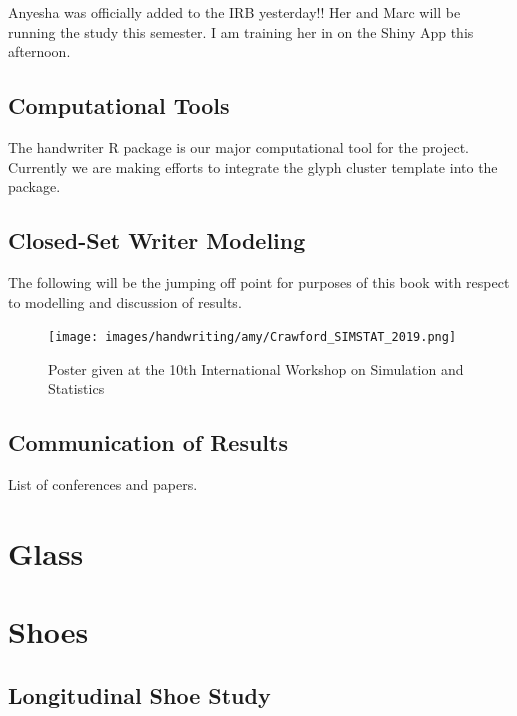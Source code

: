 \documentclass[]{book}
\begin{document}
Anyesha was officially added to the IRB yesterday!! Her and Marc will be running the study this semester. I am training her in on the Shiny App this afternoon.

\hypertarget{computational-tools-1}{%
\section{Computational Tools}\label{computational-tools-1}}

The handwriter R package is our major computational tool for the project. Currently we are making efforts to integrate the glyph cluster template into the package.

\hypertarget{closed-set-writer-modeling}{%
\section{Closed-Set Writer Modeling}\label{closed-set-writer-modeling}}

The following will be the jumping off point for purposes of this book with respect to modelling and discussion of results.

\begin{figure}
\centering
\texttt{[image: images/handwriting/amy/Crawford\_SIMSTAT\_2019.png]}
\caption{Poster given at the 10th International Workshop on Simulation and Statistics}
\end{figure}

\hypertarget{communication-of-results}{%
\section{Communication of Results}\label{communication-of-results}}

List of conferences and papers.

\hypertarget{glass}{%
\chapter{Glass}\label{glass}}

\hypertarget{shoes}{%
\chapter{Shoes}\label{shoes}}

\hypertarget{longitudinal}{%
\section{Longitudinal Shoe Study}\label{longitudinal}}
\end{document}
